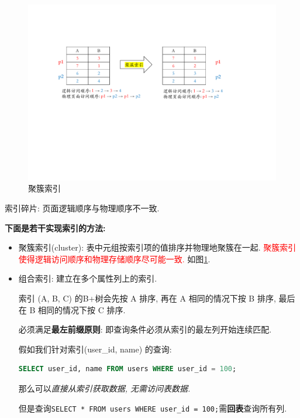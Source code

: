\begin{figure}[H]
  \centering
  \includegraphics[width=.8\textwidth]{figure/聚簇索引.pdf}
  \caption{聚簇索引}
  \label{fig:cluster}
\end{figure}

\begin{definition}[索引碎片]
  索引碎片: 页面逻辑顺序与物理顺序不一致.
\end{definition}

\textbf{下面是若干实现索引的方法:}
\begin{itemize}
  \item 聚簇索引(cluster): 表中元组按索引项的值排序并物理地聚簇在一起. \textcolor{red}{聚簇索引使得逻辑访问顺序和物理存储顺序尽可能一致.} 如图\ref{fig:cluster}.
  \item 组合索引: 建立在多个属性列上的索引. 
  
  索引 (A, B, C) 的B+树会先按 A 排序, 再在 A 相同的情况下按 B 排序, 最后在 B 相同的情况下按 C 排序.

  必须满足\textbf{最左前缀原则}: 即查询条件必须从索引的最左列开始连续匹配.

  假如我们针对索引(user\_id, name) 的查询:
  \begin{lstlisting}[language=SQL]
SELECT user_id, name FROM users WHERE user_id = 100;
  \end{lstlisting}
  那么可以\textit{直接从索引获取数据, 无需访问表数据.}

  但是查询\verb|SELECT * FROM users WHERE user_id = 100;|需\textbf{回表}查询所有列.
\end{itemize}

